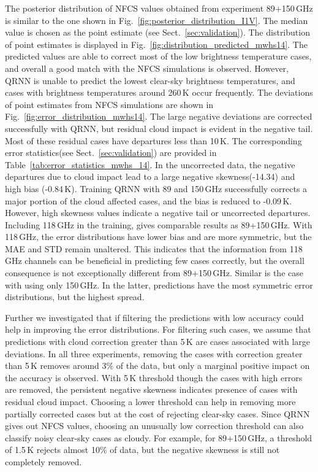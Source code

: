 \documentclass[amt, manuscript]{copernicus}
\begin{document}
The posterior distribution of NFCS values obtained from experiment 89+150\,GHz
is similar to the one shown in Fig.~\ref{fig:posterior_distribution_I1V}. The
median value is chosen as the point estimate (see Sect.~\ref{sec:validation}).
The distribution of point estimates is displayed in
Fig.~\ref{fig:distribution_predicted_mwhs14}. The predicted values are able to
correct most of the low brightness temperature cases, and overall a good match
with the NFCS simulations is observed. However, QRNN is unable to predict the
lowest clear-sky brightness temperatures, and cases with brightness temperatures
around 260\,K occur frequently. The deviations of point estimates from NFCS
simulations are shown in Fig.~\ref{fig:error_distribution_mwhs14}. The large
negative deviations are corrected successfully with QRNN, but residual cloud
impact is evident in the negative tail. Most of these residual cases have
departures less than 10\,K. The corresponding error statistics(see
Sect.~\ref{sec:validation}) are provided in
Table~\ref{tab:error_statistics_mwhs_14}. In the uncorrected data, the negative
departures due to cloud impact lead to a large negative skewness(-14.34) and
high bias (-0.84\,K). Training QRNN with 89 and 150\,GHz successfully corrects a
major portion of the cloud affected cases, and the bias is reduced to -0.09\,K.
However, high skewness values indicate a negative tail or uncorrected
departures. Including 118\,GHz in the training, gives comparable results as
89+150\,GHz. With 118\,GHz, the error distributions have lower bias and are more
symmetric, but the MAE and STD remain unaltered. This indicates that the
information from 118\,GHz channels can be beneficial in predicting few cases
correctly, but the overall consequence is not exceptionally different from
89+150\,GHz. Similar is the case with using only 150\,GHz. In the latter,
predictions have the most symmetric error distributions, but the highest spread.

Further we investigated that if filtering the predictions with low accuracy could help in improving the error distributions. For filtering such cases, we assume that predictions with cloud correction greater than 5\,K are cases associated with large deviations. In all three experiments, removing the cases with correction greater than 5\,K removes around 3\% of the data, but only a marginal positive impact on the accuracy is observed. With 5\,K threshold though the cases with high errors are removed, the persistent negative skewness indicates presence of cases with residual cloud impact. Choosing a lower threshold can help in removing more partially corrected cases but at the cost of rejecting clear-sky cases. Since QRNN gives out NFCS values, choosing an unusually low correction threshold can also classify noisy clear-sky cases as cloudy. For example, for 89+150\,GHz, a threshold of 1.5\,K rejects almost 10\% of data, but the negative skewness is still not completely removed. 
\end{document}
